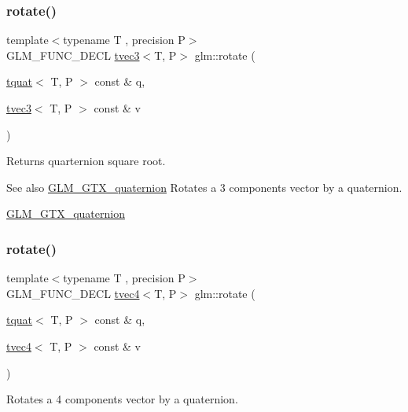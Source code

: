\subsubsection{\texorpdfstring{rotate()}{rotate()}\hspace{0.1cm}{\footnotesize\ttfamily [1/2]}}
{\footnotesize\ttfamily template$<$typename T , precision P$>$ \\
G\+L\+M\+\_\+\+F\+U\+N\+C\+\_\+\+D\+E\+CL \hyperlink{structglm_1_1tvec3}{tvec3}$<$T, P$>$ glm\+::rotate (\begin{DoxyParamCaption}\item[{\hyperlink{structglm_1_1tquat}{tquat}$<$ T, P $>$ const \&}]{q,  }\item[{\hyperlink{structglm_1_1tvec3}{tvec3}$<$ T, P $>$ const \&}]{v }\end{DoxyParamCaption})}

Returns quarternion square root.

\begin{DoxySeeAlso}{See also}
\hyperlink{group__gtx__quaternion}{G\+L\+M\+\_\+\+G\+T\+X\+\_\+quaternion} Rotates a 3 components vector by a quaternion.

\hyperlink{group__gtx__quaternion}{G\+L\+M\+\_\+\+G\+T\+X\+\_\+quaternion} 
\end{DoxySeeAlso}
\mbox{\label{group__gtx__quaternion_ga96575f8868b3f2aa3e13cab9b94ccbd3}} 
\subsubsection{\texorpdfstring{rotate()}{rotate()}\hspace{0.1cm}{\footnotesize\ttfamily [2/2]}}
{\footnotesize\ttfamily template$<$typename T , precision P$>$ \\
G\+L\+M\+\_\+\+F\+U\+N\+C\+\_\+\+D\+E\+CL \hyperlink{structglm_1_1tvec4}{tvec4}$<$T, P$>$ glm\+::rotate (\begin{DoxyParamCaption}\item[{\hyperlink{structglm_1_1tquat}{tquat}$<$ T, P $>$ const \&}]{q,  }\item[{\hyperlink{structglm_1_1tvec4}{tvec4}$<$ T, P $>$ const \&}]{v }\end{DoxyParamCaption})}

Rotates a 4 components vector by a quaternion.

